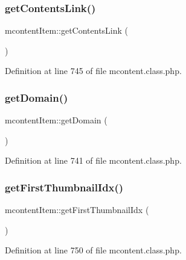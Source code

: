 \subsubsection{\texorpdfstring{get\+Contents\+Link()}{getContentsLink()}}
{\footnotesize\ttfamily mcontent\+Item\+::get\+Contents\+Link (\begin{DoxyParamCaption}{ }\end{DoxyParamCaption})}



Definition at line 745 of file mcontent.\+class.\+php.

\hypertarget{classmcontentItem_a29a4fb4f4bedd748ec93238be37a22fb}{}\label{classmcontentItem_a29a4fb4f4bedd748ec93238be37a22fb} 
\subsubsection{\texorpdfstring{get\+Domain()}{getDomain()}}
{\footnotesize\ttfamily mcontent\+Item\+::get\+Domain (\begin{DoxyParamCaption}{ }\end{DoxyParamCaption})}



Definition at line 741 of file mcontent.\+class.\+php.

\hypertarget{classmcontentItem_acb7e5ab4fbeac716585618eba64960aa}{}\label{classmcontentItem_acb7e5ab4fbeac716585618eba64960aa} 
\subsubsection{\texorpdfstring{get\+First\+Thumbnail\+Idx()}{getFirstThumbnailIdx()}}
{\footnotesize\ttfamily mcontent\+Item\+::get\+First\+Thumbnail\+Idx (\begin{DoxyParamCaption}{ }\end{DoxyParamCaption})}



Definition at line 750 of file mcontent.\+class.\+php.

\hypertarget{classmcontentItem_a5a2cad58644aabb016942e427998f32c}{}\label{classmcontentItem_a5a2cad58644aabb016942e427998f32c} 

